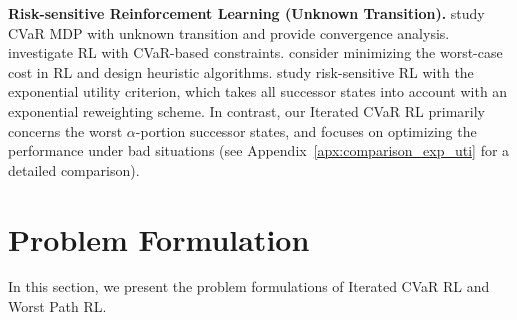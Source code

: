 \documentclass{article} %
\newcommand{\revision}[1]{{\color{black} #1}}
\begin{document}
	\textbf{Risk-sensitive Reinforcement Learning (Unknown Transition).}
	\revision{\cite{tamar2015optimizing,keramati2020being} study CVaR MDP with unknown transition and provide convergence analysis.}
	\cite{borkar2014risk,chow2014algorithms,chow2017risk} investigate RL with CVaR-based constraints.
	\cite{heger1994consideration,coraluppi1997mixed,coraluppi1999risk} consider minimizing the worst-case cost in RL and design heuristic algorithms. 
	\revision{\cite{fei2020near_optimal,fei2021exponential,fei2021function_approx} study risk-sensitive RL with the exponential utility criterion,
		which takes all successor states into account with an exponential reweighting scheme. In contrast, our Iterated CVaR RL primarily concerns the worst $\alpha$-portion successor states, and focuses on optimizing the performance under bad situations (see Appendix~\ref{apx:comparison_exp_uti} for a detailed comparison).}
	
	
	
	\section{Problem Formulation} \label{sec:formulation}
	In this section, we present the problem formulations of Iterated CVaR RL and Worst Path RL. 
	
\end{document}
